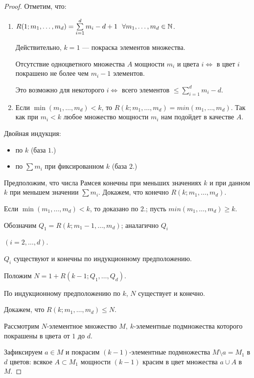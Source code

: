 \begin{proof}
    Отметим, что:
    \begin{enumerate}
        \item $R(1;m_1,\ldots,m_d) = \sum\limits_{i=1}^d m_i - d + 1~~\forall m_1,\ldots,m_d \in \mathbb{N}$.
        
        Действительно, $k=1$ --- покраска элементов множества.

        Отсутствие одноцветного множества $A$ мощности $m_i$ и цвета $i \iff$ в цвет $i$ покрашено не более чем $m_i - 1$ элементов.

        Это возможно для некоторого $i \iff$ всего элементов $\leq \sum\limits_{i=1}^d m_i - d$.
        
        \item Если $\min(m_1,\ldots,m_d) < k$, то $R(k;m_1,\ldots,m_d) = min(m_1,\ldots,m_d)$.
        Так как при $m_i < k$ любое множество мощности $m_i$ нам подойдет в качестве $A$.
    \end{enumerate}
    
    Двойная индукция:
    \begin{itemize}
        \item по $k$ (база $1.$)
        \item по $\sum m_i$ при фиксированном $k$ (база $2.$)
    \end{itemize}
    
    Предположим, что числа Рамсея конечны при меньших значениях $k$ и при данном $k$ при меньшем значении $\sum m_i$. Докажем, что конечно $R(k;m_1,\ldots,m_d)$.

    Если $\min(m_1,\ldots,m_d) < k$, то доказано по $2.$; пусть $min(m_1,\ldots,m_d) \geq k$.

    Обозначим $Q_1 = R(k;m_1 - 1, \ldots, m_d)$; аналагично $Q_i$

    $(i = 2,\ldots,d)$.

    $Q_i$ существуют и конечны по индукционному предположению.

    Положим $N = 1 + R(k-1;Q_1,\ldots,Q_d)$.

    По индукционному предположению по $k$, $N$ существует и конечно.

    Докажем, что $R(k;m_1,\ldots,m_d) \leq N$.

    Рассмотрим $N$-элементное множество $M,~k$-элементные подмножества которого покрашены в цвета от $1$ до $d$.

    Зафиксируем $a \in M$ и покрасим $(k - 1)$-элементные подмножества $M \setminus a = M_1$ в $d$ цветов: всякое $A \subset M_1$ мощности $(k - 1)$ красим в цвет множества $a \cup A$ в $M$.


\end{proof}
